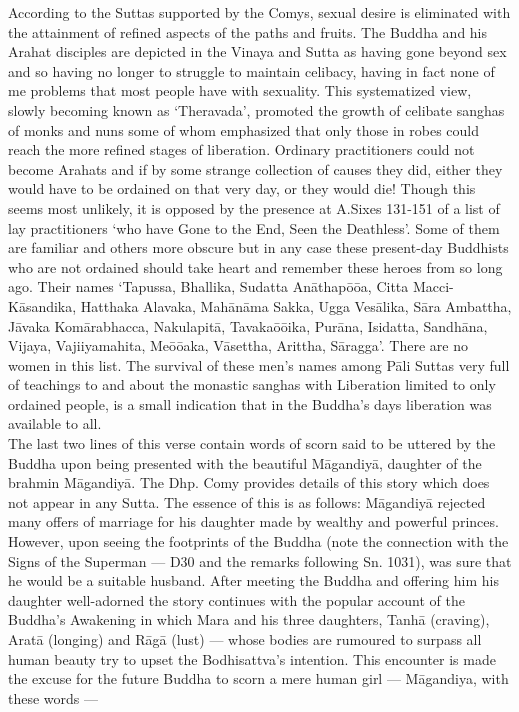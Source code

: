 According to the Suttas supported by the Comys, sexual desire is eliminated with the attainment of refined aspects of the paths and fruits. The Buddha and his Arahat disciples are depicted in the Vinaya and Sutta as having gone beyond sex and so having no longer to struggle to maintain celibacy, having in fact none of me problems that most people have with sexuality. This systematized view, slowly becoming known as `Theravada', promoted the growth of celibate sanghas of monks and nuns some of whom emphasized that only those in robes could reach the more refined stages of liberation. Ordinary practitioners could not become Arahats and if by some strange collection of causes they did, either they would have to be ordained on that very day, or they would die! Though this seems most unlikely, it is opposed by the presence at A.Sixes 131-151 of a list of lay practitioners `who have Gone to the End, Seen the Deathless'. Some of them are familiar and others more obscure but in any case these present-day Buddhists who are not ordained should take heart and remember these heroes from so long ago. Their names `Tapussa, Bhallika, Sudatta An\=athap\=o\=oa, Citta Macci-K\=asandika, Hatthaka Alavaka, Mah\=an\=ama Sakka, Ugga Ves\=alika, S\=ara Ambattha, J\=avaka Kom\=arabhacca, Nakulapit\=a, Tavaka\=o\=oika, Pur\=ana, Isidatta, Sandh\=ana, Vijaya, Vajiiyamahita, Me\=o\=oaka, V\=asettha, Arittha, S\=aragga'. There are no women in this list. The survival of these men's names among P\=ali Suttas very full of teachings to and about the monastic sanghas with Liberation limited to only ordained people, is a small indication that in the Buddha's days liberation was available to all.\\

The last two lines of this verse contain words of scorn said to be uttered by the Buddha upon being presented with the beautiful M\=agandiy\=a, daughter of the brahmin M\=agandiy\=a. The Dhp. Comy provides details of this story which does not appear in any Sutta. The essence of this is as follows: M\=agandiy\=a rejected many offers of marriage for his daughter made by wealthy and powerful princes. However, upon seeing the footprints of the Buddha (note the connection with the Signs of the Superman — D30 and the remarks following Sn. 1031), was sure that he would be a suitable husband. After meeting the Buddha and offering him his daughter well-adorned the story continues with the popular account of the Buddha's Awakening in which Mara and his three daughters, Tanh\=a (craving), Arat\=a (longing) and R\=ag\=a (lust) — whose bodies are rumoured to surpass all human beauty try to upset the Bodhisattva's intention. This encounter is made the excuse for the future Buddha to scorn a mere human girl — M\=agandiya, with these words —

